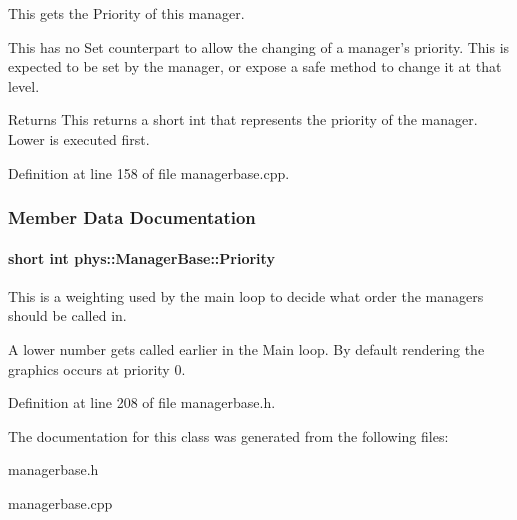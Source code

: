 This gets the Priority of this manager. 

This has no Set counterpart to allow the changing of a manager's priority. This is expected to be set by the manager, or expose a safe method to change it at that level. \begin{DoxyReturn}{Returns}
This returns a short int that represents the priority of the manager. Lower is executed first. 
\end{DoxyReturn}


Definition at line 158 of file managerbase.cpp.



\subsubsection{Member Data Documentation}
\hypertarget{classphys_1_1ManagerBase_a28e2690fbcf644a7780a53b81821d8ef}{
\paragraph[{Priority}]{\setlength{\rightskip}{0pt plus 5cm}short int {\bf phys::ManagerBase::Priority}}\hfill}
\label{classphys_1_1ManagerBase_a28e2690fbcf644a7780a53b81821d8ef}


This is a weighting used by the main loop to decide what order the managers should be called in. 

A lower number gets called earlier in the Main loop. By default rendering the graphics occurs at priority 0. 

Definition at line 208 of file managerbase.h.



The documentation for this class was generated from the following files:\begin{DoxyCompactItemize}
\item 
managerbase.h\item 
managerbase.cpp\end{DoxyCompactItemize}
